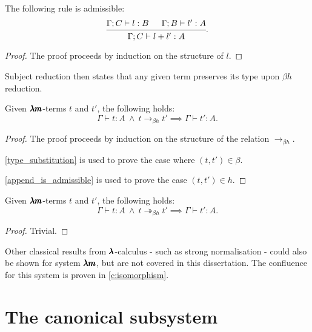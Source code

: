 \begin{lemma}
  \label{append_is_admissible}
  The following rule is admissible:
  \[
    \begin{prooftree}
      \hypo{ \Gamma ; C \vdash l:B }
      \hypo{ \Gamma ; B \vdash l':A }
      \infer2{ \Gamma ; C \vdash  l+l' : A }
    \end{prooftree}.
  \]
\end{lemma}
\begin{proof}
  The proof proceeds by induction on the structure of $l$.
\end{proof}


Subject reduction then states that any given term preserves its type upon $\beta h$ reduction.

\begin{theorem}
  \label{type_preservation}
  Given $\pmb{\lambda m}$-terms $t$ and $t'$, the following holds:
  \[
    \Gamma \vdash t : A \ \land \ t \to_{\beta h} t' \implies \Gamma \vdash t' : A.
  \]
\end{theorem}
\begin{proof}
  The proof proceeds by induction on the structure of the relation $\to_{\beta h}$.

  \cref{type_substitution} is used to prove the case where $(t, t') \in \beta$.

  \cref{append_is_admissible} is used to prove the case $(t, t') \in h$.
\end{proof}

\begin{corollary}
  \label{type_preservation2}
  Given $\pmb{\lambda m}$-terms $t$ and $t'$, the following holds:
  \[
    \Gamma \vdash t : A \ \land \ t \twoheadrightarrow_{\beta h} t' \implies \Gamma \vdash t' : A.
  \]
\end{corollary}
\begin{proof}
  Trivial.
\end{proof}
  
Other classical results from $\pmb{\lambda}$-calculus - such as strong normalisation - could also be shown for system $\pmb{\lambda m}$, but are not covered in this dissertation.
The confluence for this system is proven in \cref{c:isomorphism}.


\section{The canonical subsystem}

